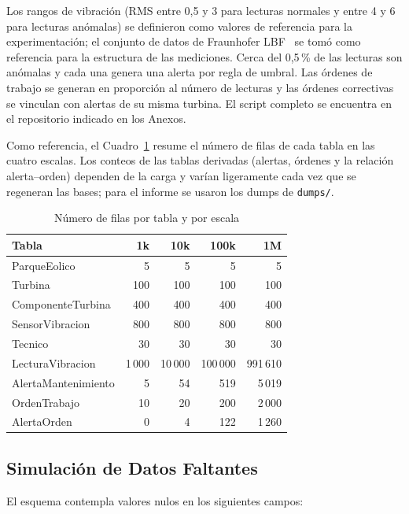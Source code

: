 \documentclass[11pt,a4paper]{article}
\begin{document}
Los rangos de vibración (RMS entre 0,5 y 3 para lecturas normales y entre 4 y 6
para lecturas anómalas) se definieron como valores de referencia para la
experimentación; el conjunto de datos de Fraunhofer LBF~\cite{fraunhofer} se
tomó como referencia para la estructura de las mediciones. Cerca del 0,5\,\% de
las lecturas son anómalas y cada una genera una alerta por regla de umbral. Las
órdenes de trabajo se generan en proporción al número de lecturas y las órdenes
correctivas se vinculan con alertas de su misma turbina. El script completo se
encuentra en el repositorio indicado en los Anexos.

Como referencia, el Cuadro~\ref{tab:filas_dump} resume el número de filas de cada
tabla en las cuatro escalas. Los conteos de las tablas derivadas (alertas,
órdenes y la relación alerta--orden) dependen de la carga y varían ligeramente
cada vez que se regeneran las bases; para el informe se usaron los dumps de
\texttt{dumps/}.

\begin{table}[H]
\centering
\small
\caption{Número de filas por tabla y por escala}
\label{tab:filas_dump}
\begin{tabular}{|l|r|r|r|r|}
\hline
\textbf{Tabla} & \textbf{1k} & \textbf{10k} & \textbf{100k} & \textbf{1M} \\ \hline
ParqueEolico & 5 & 5 & 5 & 5 \\ \hline
Turbina & 100 & 100 & 100 & 100 \\ \hline
ComponenteTurbina & 400 & 400 & 400 & 400 \\ \hline
SensorVibracion & 800 & 800 & 800 & 800 \\ \hline
Tecnico & 30 & 30 & 30 & 30 \\ \hline
LecturaVibracion & 1\,000 & 10\,000 & 100\,000 & 991\,610 \\ \hline
AlertaMantenimiento & 5 & 54 & 519 & 5\,019 \\ \hline
OrdenTrabajo & 10 & 20 & 200 & 2\,000 \\ \hline
AlertaOrden & 0 & 4 & 122 & 1\,260 \\ \hline
\end{tabular}
\end{table}

\subsection{Simulación de Datos Faltantes}

El esquema contempla valores nulos en los siguientes campos:
\end{document}
